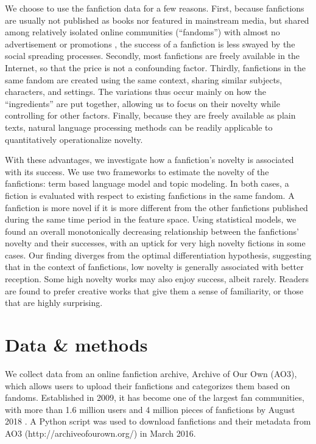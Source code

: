 \documentclass[letterpaper]{article} %
\begin{document}
We choose to use the fanfiction data for a few reasons. First, because fanfictions are usually not published as books nor featured in mainstream media, but shared among relatively isolated online communities (``fandoms'') with almost no advertisement or promotions \cite{wiki:fandom}, the success of a fanfiction is less swayed by the social spreading processes. Secondly, most fanfictions are freely available in the Internet, so that the price is not a confounding factor. Thirdly, fanfictions in the same fandom are created using the same context, sharing similar subjects, characters, and settings. The variations thus occur mainly on how the ``ingredients'' are put together, allowing us to focus on their novelty while controlling for other factors. Finally, because they are freely available as plain texts, natural language processing methods can be readily applicable to quantitatively operationalize novelty. 

With these advantages, we investigate how a fanfiction's novelty is associated with its success. We use two frameworks to estimate the novelty of the fanfictions:  term based language model and topic modeling. In both cases, a fiction is evaluated with respect to existing fanfictions in the same fandom. A fanfiction is more novel if it is more different from the other fanfictions published during the same time period in the feature space. Using statistical models, we found an overall monotonically decreasing relationship between the fanfictions' novelty and their successes, with an uptick for very high novelty fictions in some cases. Our finding diverges from the optimal differentiation hypothesis, suggesting that in the context of fanfictions, low novelty is generally associated with better reception. Some  high novelty works may also enjoy success, albeit rarely. Readers are found to prefer creative works that give them a sense of familiarity, or those that are highly surprising.

\section*{Data \& methods}

We collect data from an online fanfiction archive, Archive of Our Own (AO3), which allows users to upload their fanfictions and categorizes them based on fandoms. Established in 2009, it has become one of the largest fan communities, with more than 1.6 million users and 4 million pieces of fanfictions by August 2018 \cite{ao3stats}. A Python script was used to download fanfictions and their metadata from AO3 (http://archiveofourown.org/) in March 2016. 
\end{document}
